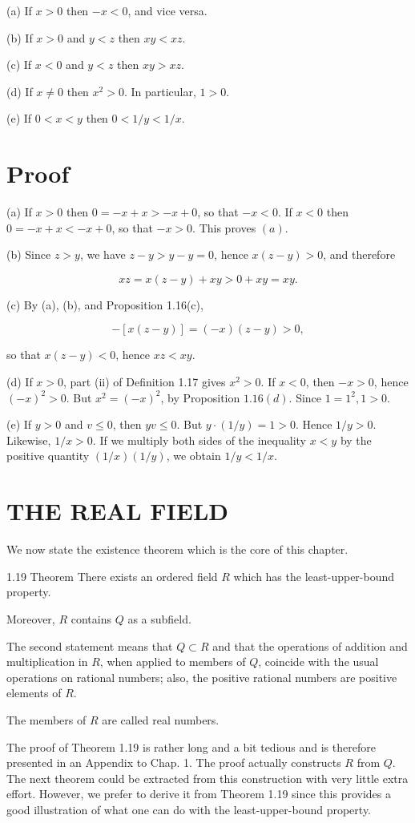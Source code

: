 \documentclass[10pt]{article}
\begin{document}
(a) If $x>0$ then $-x<0$, and vice versa.

(b) If $x>0$ and $y<z$ then $x y<x z$.

(c) If $x<0$ and $y<z$ then $x y>x z$.

(d) If $x \neq 0$ then $x^{2}>0$. In particular, $1>0$.

(e) If $0<x<y$ then $0<1 / y<1 / x$.

\section{Proof}
(a) If $x>0$ then $0=-x+x>-x+0$, so that $-x<0$. If $x<0$ then $0=-x+x<-x+0$, so that $-x>0$. This proves $(a)$.

(b) Since $z>y$, we have $z-y>y-y=0$, hence $x(z-y)>0$, and therefore

$$
x z=x(z-y)+x y>0+x y=x y .
$$

(c) By (a), (b), and Proposition 1.16(c),

$$
-[x(z-y)]=(-x)(z-y)>0,
$$

so that $x(z-y)<0$, hence $x z<x y$.

(d) If $x>0$, part (ii) of Definition 1.17 gives $x^{2}>0$. If $x<0$, then $-x>0$, hence $(-x)^{2}>0$. But $x^{2}=(-x)^{2}$, by Proposition $1.16(d)$. Since $1=1^{2}, 1>0$.

(e) If $y>0$ and $v \leq 0$, then $y v \leq 0$. But $y \cdot(1 / y)=1>0$. Hence $1 / y>0$. Likewise, $1 / x>0$. If we multiply both sides of the inequality $x<y$ by the positive quantity $(1 / x)(1 / y)$, we obtain $1 / y<1 / x$.

\section{THE REAL FIELD}
We now state the existence theorem which is the core of this chapter.

1.19 Theorem There exists an ordered field $R$ which has the least-upper-bound property.

Moreover, $R$ contains $Q$ as a subfield.

The second statement means that $Q \subset R$ and that the operations of addition and multiplication in $R$, when applied to members of $Q$, coincide with the usual operations on rational numbers; also, the positive rational numbers are positive elements of $R$.

The members of $R$ are called real numbers.

The proof of Theorem 1.19 is rather long and a bit tedious and is therefore presented in an Appendix to Chap. 1. The proof actually constructs $R$ from $Q$. The next theorem could be extracted from this construction with very little extra effort. However, we prefer to derive it from Theorem 1.19 since this provides a good illustration of what one can do with the least-upper-bound property.
\end{document}
